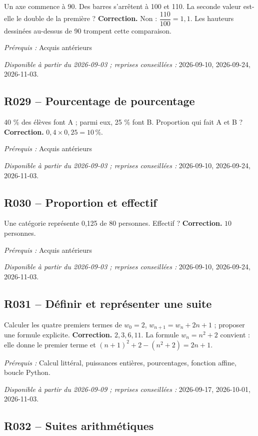 Un axe commence à 90. Des barres s’arrêtent à 100 et 110. La seconde valeur est-elle le double de la première ?
\ifprof\textbf{Correction.} Non : $\dfrac{110}{100}=1{,}1$. Les hauteurs dessinées au-dessus de 90 trompent cette comparaison.\par\textit{Prérequis :} Acquis antérieurs\par\textit{Disponible à partir du 2026-09-03 ; reprises conseillées :} 2026-09-10, 2026-09-24, 2026-11-03.\fi
{}\subsection*{R029 -- Pourcentage de pourcentage}\label{R029}
40 \% des élèves font A ; parmi eux, 25 \% font B. Proportion qui fait A et B ?
\ifprof\textbf{Correction.} $0{,}4\times0{,}25=10\,\%$.\par\textit{Prérequis :} Acquis antérieurs\par\textit{Disponible à partir du 2026-09-03 ; reprises conseillées :} 2026-09-10, 2026-09-24, 2026-11-03.\fi
{}\subsection*{R030 -- Proportion et effectif}\label{R030}
Une catégorie représente 0,125 de 80 personnes. Effectif ?
\ifprof\textbf{Correction.} $10$ personnes.\par\textit{Prérequis :} Acquis antérieurs\par\textit{Disponible à partir du 2026-09-03 ; reprises conseillées :} 2026-09-10, 2026-09-24, 2026-11-03.\fi
{}\subsection*{R031 -- Définir et représenter une suite}\label{R031}
Calculer les quatre premiers termes de $w_0=2$, $w_{n+1}=w_n+2n+1$ ; proposer une formule explicite.
\ifprof\textbf{Correction.} $2,3,6,11$. La formule $w_n=n^2+2$ convient : elle donne le premier terme et $(n+1)^2+2-(n^2+2)=2n+1$.\par\textit{Prérequis :} Calcul littéral, puissances entières, pourcentages, fonction affine, boucle Python.\par\textit{Disponible à partir du 2026-09-09 ; reprises conseillées :} 2026-09-17, 2026-10-01, 2026-11-03.\fi
{}\subsection*{R032 -- Suites arithmétiques}\label{R032}

